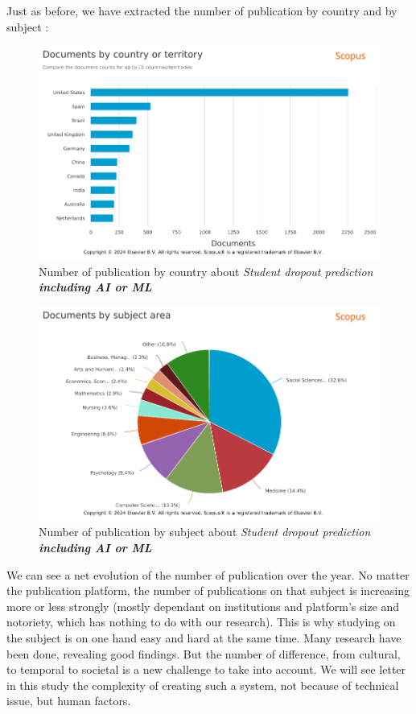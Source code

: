 \documentclass[../../main.tex]{subfiles}
\begin{document}
Just as before, we have extracted the number of publication by country and by subject :
\begin{figure}[H]
    \centering
    \includegraphics[width=1\linewidth]{res//graph/prediction student with AI/Scopus-Analyze-Country.png}
    \caption{Number of publication by country about \textit{Student dropout prediction \textbf{including AI or ML}}}
    \label{fig:nb_pub_scopus_predictstudent_country}
\end{figure}

\begin{figure}[H]
    \centering
    \includegraphics[width=1\linewidth]{res//graph/prediction student with AI/Scopus-Analyze-Subject.png}
    \caption{Number of publication by subject about \textit{Student dropout prediction \textbf{including AI or ML}}}
    \label{fig:nb_pub_scopus_predictstudent_subject}
\end{figure}


We can see a net evolution of the number of publication over the year. No matter the publication platform, the number of publications on that subject is increasing more or less strongly (mostly dependant on institutions and platform's size and notoriety, which has nothing to do with our research).
This is why studying on the subject is on one hand easy and hard at the same time. Many research have been done, revealing good findings. But the number of difference, from cultural, to temporal to societal is a new challenge to take into account. We will see letter in this study the complexity of creating such a system, not because of technical issue, but human factors.
\end{document}
